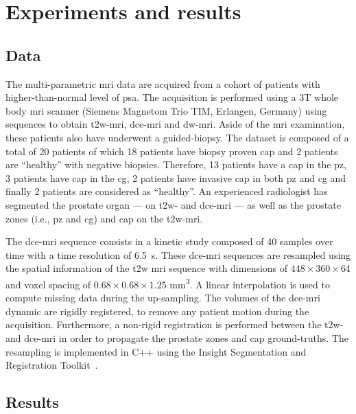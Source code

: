 \section{Experiments and results}\label{sec:experiments}

\subsection{Data}\label{sec:data}

The multi-parametric \ac{mri} data are acquired from a cohort of patients with higher-than-normal level of \ac{psa}.
The acquisition is performed using a 3T whole body \ac{mri} scanner (Siemens Magnetom Trio TIM, Erlangen, Germany) using sequences to obtain \ac{t2w}-\ac{mri}, \ac{dce}-\ac{mri} and \ac{dw}-\ac{mri}.
Aside of the \ac{mri} examination, these patients also have underwent a guided-biopsy.
The dataset is composed of a total of 20 patients of which 18 patients have biopsy proven \ac{cap} and 2 patients are ``healthy'' with negative biopsies.
Therefore, 13 patients have a \ac{cap} in the \ac{pz}, 3 patients have \ac{cap} in the \ac{cg}, 2 patients have invasive \ac{cap} in both \ac{pz} and \ac{cg} and finally 2 patients are considered as ``healthy''.
An experienced radiologist has segmented the prostate organ --- on \ac{t2w}- and \ac{dce}-\ac{mri} --- as well as the prostate zones (i.e., \ac{pz} and \ac{cg}) and \ac{cap} on the \ac{t2w}-\ac{mri}.

The \ac{dce}-\ac{mri} sequence consists in a kinetic study composed of 40 samples over time with a time resolution of \SI{6.5}{\second}.
These \ac{dce}-\ac{mri} sequences are resampled using the spatial information of the \ac{t2w} \ac{mri} sequence with dimensions of $448 \times 360 \times 64$ and voxel spacing of $0.68 \times 0.68 \times 1.25 $ mm\textsuperscript{3}.
A linear interpolation is used to compute missing data during the up-sampling.
The volumes of the \ac{dce}-\ac{mri} dynamic are rigidly registered, to remove any patient motion during the acquisition.
Furthermore, a non-rigid registration is performed between the \ac{t2w}- and \ac{dce}-\ac{mri} in order to propagate the prostate zones and \ac{cap} ground-truths.
The resampling is implemented in C++ using the Insight Segmentation and Registration Toolkit~\citep{ibanez2005itk}.

\subsection{Results}

